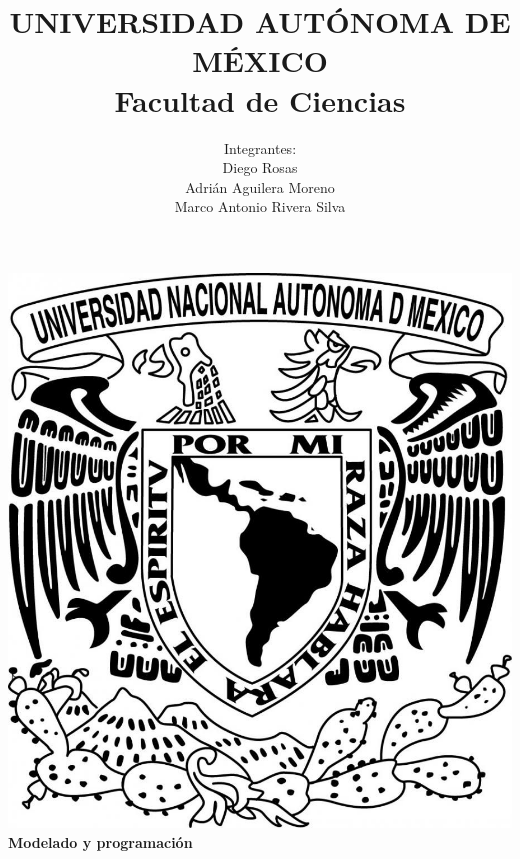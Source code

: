 \title{UNIVERSIDAD AUT\'ONOMA DE M\'EXICO\\ Facultad de Ciencias}
\author{Integrantes:\\
  Diego Rosas\\
  Adri\'an Aguilera Moreno\\
  Marco Antonio Rivera Silva}
\date{}
\maketitle
\begin{center}
  \includegraphics[scale=0.20]{../Portada/Portada}\\[0.4cm]
  \Large
  \bf{Modelado y programación}
  \normalsize
\end{center}
\newpage
{}

